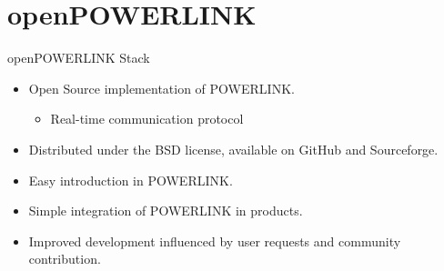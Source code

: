 \section{openPOWERLINK}
\begin{frame}{openPOWERLINK Stack}
    \begin{itemize}
        \item Open Source implementation of POWERLINK.
        \begin{itemize}
            \item Real-time communication protocol
        \end{itemize}
        \item Distributed under the BSD license, available on GitHub and Sourceforge.
        \item Easy introduction in POWERLINK.
        \item Simple integration of POWERLINK in products.
        \item Improved development influenced by user requests and community contribution.
    \end{itemize}
\end{frame}

